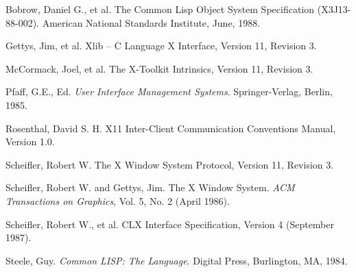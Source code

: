 %
%
%
%
%
%
%
%
\begin{thebibliography}{9}

 Bobrow, Daniel G., et al. The Common Lisp Object System
Specification (X3J13-88-002). American National Standards Institute, June,
1988.

 Gettys, Jim, et al. Xlib -- C Language X Interface, Version
11, Revision 3.

 McCormack, Joel, et al. The X-Toolkit Intrinsics, Version
11, Revision 3.

 Pfaff, G.E., Ed. {\em User Interface Management Systems}.
Springer-Verlag, Berlin, 1985.

 Rosenthal, David S. H. X11 Inter-Client Communication Conventions
Manual, Version 1.0.


 Scheifler, Robert W. The X Window System Protocol, Version
11, Revision 3.

 Scheifler, Robert W. and Gettys, Jim. The X Window
System. {\em ACM Transactions on Graphics}, Vol. 5, No. 2 (April 1986).

 Scheifler, Robert W., et al. CLX Interface
Specification, Version 4 (September 1987).

 Steele, Guy. {\em Common LISP: The Language}. Digital Press,
Burlington, MA, 1984.


\end{thebibliography}


\begin{theindex}

\end{theindex}






